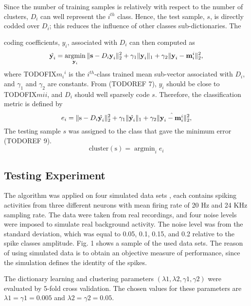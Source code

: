 \documentclass[conference]{IEEEtran}
\DeclareMathOperator*{\argmin}{argmin}
\begin{document}
	Since the number of training samples is relatively with respect to the number of clusters, $D_i$ can well represent the $i^{th}$ class. Hence, the test sample, $s$, is directly codded over $D_i$; this reduces the influence of other classes sub-dictionaries. The
	
	 
	coding coefficients, $y_i$, associated with $D_i$ can then computed as
	\begin{equation}
		\hat{\textbf{y}_i}=\argmin_{\textbf{y}_i}\paralleled{\textbf{s}-D_i\textbf{y}_i}_2^2+\gamma_1\paralleled{\textbf{y}_i}_1+\gamma_2\paralleled{\textbf{y}_i-\textbf{m}_i^i}_2^2,
	\end{equation}
	where TODOFIX${m_i}^i$ is the $i^{th}$-class trained mean sub-vector associated with $D_i$, and $\gamma_1$ and $\gamma_2$ are constants. From (TODOREF 7), $y_i$ should be close to TODOFIX$mi i$, and $D_i$ should well sparsely code $s$. Therefore, the classification metric is defined by
	\begin{equation}
		e_i=\Vert{\text{s}-D_i\hat{\textbf{y}_i}}\Vert_2^2+\gamma_1\Vert{\hat{\textbf{y}_i}}\Vert_1+\gamma_2\Vert{\hat{\textbf{y}_i-\textbf{m}_i^i}}\Vert_2^2,
	\end{equation}
	The testing sample $s$ was assigned to the class that gave the minimum error (TODOREF 9).
	\begin{equation}
		\mathrm{cluster(s)}=\argmin_ie_i
	\end{equation}
	
	\subsection{Testing Experiment}
	The algorithm was applied on four simulated data sets \cite{quiroga2004unsupervised}, each contains spiking activities from three different neurons with mean firing rate of 20 Hz and 24 KHz sampling rate. The data were taken from real recordings, and four noise levels were imposed to simulate real background activity. The noise level was from the standard deviation, which was equal to 0.05, 0.1, 0.15, and 0.2 relative to the spike classes amplitude. Fig. 1 shows a sample of the used data sets. The reason of using simulated data is to obtain an objective measure of performance, since the simulation defines the identity of the spikes.
	
	The dictionary learning and clustering parameters
	$(\lambda1, \lambda2, \gamma1, \gamma2)$ were evaluated by 5-fold cross validation. The chosen values for these parameters are $\lambda1 = \gamma1 = 0.005$ and $\lambda2 = \gamma2 = 0.05$.
	
\end{document}
